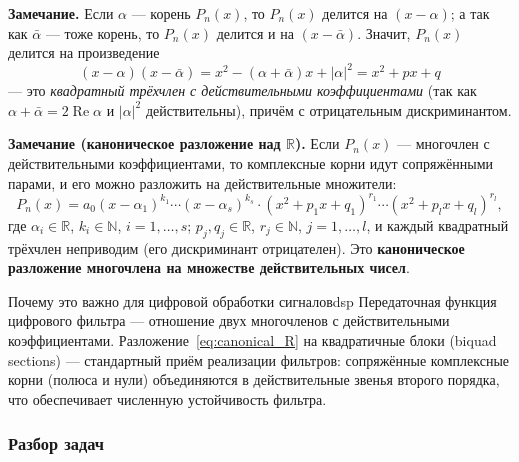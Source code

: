 \documentclass[12pt,a4paper]{article}
\begin{document}
\noindent\textbf{Замечание.} Если $\alpha$ — корень $P_n(x)$, то
$P_n(x)$ делится на $(x - \alpha)$; а так как $\bar\alpha$ — тоже
корень, то $P_n(x)$ делится и на $(x - \bar\alpha)$. Значит, $P_n(x)$
делится на произведение
\[
(x - \alpha)(x - \bar\alpha)
= x^2 - (\alpha + \bar\alpha) x + |\alpha|^2
= x^2 + p x + q
\]
— это \emph{квадратный трёхчлен с действительными коэффициентами}
(так как $\alpha + \bar\alpha = 2\operatorname{Re}\alpha$ и
$|\alpha|^2$ действительны), причём с отрицательным дискриминантом.

\noindent\textbf{Замечание (каноническое разложение над
$\mathbb{R}$).} Если $P_n(x)$ — многочлен с действительными
коэффициентами, то комплексные корни идут сопряжёнными парами, и его
можно разложить на действительные множители:
\begin{equation}
P_n(x) = a_0 (x - \alpha_1)^{k_1} \cdots (x - \alpha_s)^{k_s}
\cdot (x^2 + p_1 x + q_1)^{r_1} \cdots (x^2 + p_l x + q_l)^{r_l},
\tag{13.6} \label{eq:canonical_R}
\end{equation}
где $\alpha_i \in \mathbb{R}$, $k_i \in \mathbb{N}$, $i = 1, \dots, s$;
$p_j, q_j \in \mathbb{R}$, $r_j \in \mathbb{N}$, $j = 1, \dots, l$, и
каждый квадратный трёхчлен неприводим (его дискриминант отрицателен).
Это \textbf{каноническое разложение многочлена на множестве
действительных чисел}.

\begin{remarkIT}{Почему это важно для цифровой обработки сигналов}{dsp}
Передаточная функция цифрового фильтра — отношение двух многочленов
с действительными коэффициентами. Разложение~\eqref{eq:canonical_R}
на квадратичные блоки (biquad sections) — стандартный приём
реализации фильтров: сопряжённые комплексные корни (полюса и нули)
объединяются в действительные звенья второго порядка, что
обеспечивает численную устойчивость фильтра.
\end{remarkIT}

\subsubsection*{Разбор задач}
\end{document}
